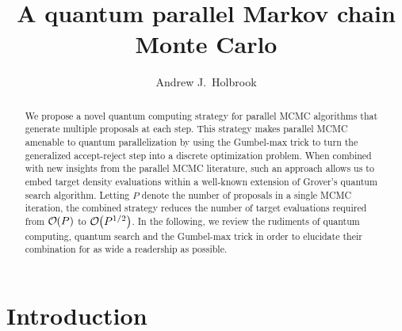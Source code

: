 \documentclass[12pt]{article} %
\title{A quantum parallel Markov chain Monte Carlo}
\date{}
\author{Andrew J.~Holbrook}
\affil{UCLA Biostatistics}
\newcommand{\order}[1]{{\cal O}\hspace{-0.2em}\left( #1 \right)}
\begin{document}
\maketitle




\begin{abstract}

We propose a novel quantum computing strategy for parallel MCMC algorithms that generate multiple proposals at each step. This strategy makes parallel MCMC amenable to quantum parallelization by using the Gumbel-max trick to turn the generalized accept-reject step into a discrete optimization problem.  When combined with new insights from the parallel MCMC literature, such an approach allows us to embed target density evaluations within a well-known extension of Grover's quantum search algorithm.  Letting $P$ denote the number of proposals in a single MCMC iteration, the combined strategy reduces the number of target evaluations required from $\order{P}$ to $\order{P^{1/2}}$.  In the following, we review the rudiments of quantum computing, quantum search and the Gumbel-max trick in order to elucidate their combination for as wide a readership as possible. 


\end{abstract}


\section{Introduction}

\newcommand{\ttheta}{\boldsymbol{\theta}}
\newcommand{\Ttheta}{\boldsymbol{\Theta}}
\newcommand{\dd}{\mbox{d}}
\newcommand{\ppsi}{\boldsymbol{\psi}}
\newcommand{\U}{\mathbf{U}}
\newcommand{\I}{\mathbf{I}}
\renewcommand{\H}{\mathbf{H}}
\newcommand{\A}{\mathbf{A}}
\newcommand{\B}{\mathbf{B}}
\newcommand{\G}{\mathbf{G}}
\newcommand{\ppi}{\boldsymbol{\pi}}
\newcommand{\llambda}{\boldsymbol{\lambda}}
\end{document}
